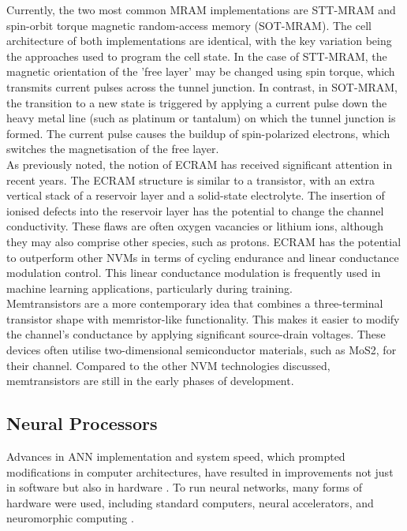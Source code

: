\noindent Currently, the two most common MRAM implementations are STT-MRAM and spin-orbit torque magnetic random-access memory (SOT-MRAM). The cell architecture of both implementations are identical, with the key variation being the approaches used to program the cell state. In the case of STT-MRAM, the magnetic orientation of the 'free layer' may be changed using spin torque, which transmits current pulses across the tunnel junction. In contrast, in SOT-MRAM, the transition to a new state is triggered by applying a current pulse down the heavy metal line (such as platinum or tantalum) on which the tunnel junction is formed. The current pulse causes the buildup of spin-polarized electrons, which switches the magnetisation of the free layer. \\

\noindent As previously noted, the notion of ECRAM has received significant attention in recent years. The ECRAM structure is similar to a transistor, with an extra vertical stack of a reservoir layer and a solid-state electrolyte. The insertion of ionised defects into the reservoir layer has the potential to change the channel conductivity. These flaws are often oxygen vacancies or lithium ions, although they may also comprise other species, such as protons. ECRAM has the potential to outperform other NVMs in terms of cycling endurance and linear conductance modulation control. This linear conductance modulation is frequently used in machine learning applications, particularly during training. \\

\noindent Memtransistors are a more contemporary idea that combines a three-terminal transistor shape with memristor-like functionality. This makes it easier to modify the channel's conductance by applying significant source-drain voltages. These devices often utilise two-dimensional semiconductor materials, such as MoS2, for their channel. Compared to the other NVM technologies discussed, memtransistors are still in the early phases of development. 

\subsection[Neural Processors]{Neural Processors}

Advances in ANN implementation and system speed, which prompted modifications in computer architectures, have resulted in improvements not just in software but also in hardware \cite{indiveri2015memory}. To run neural networks, many forms of hardware were used, including standard computers, neural accelerators, and neuromorphic computing \cite{majumdar2012massively}. \\


